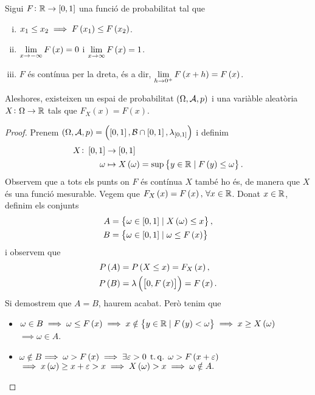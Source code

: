 \begin{teo}
  Sigui $F\colon \mathbb{R} \to [0,1]$ una funció de probabilitat tal que
  \begin{enumerate}[i)]
       \item $x_1\leq x_2\implies F\left( x_1\right) \leq F\left( x_2\right)$.
       \item $\lim\limits_{x\to-\infty}F\left( x\right) = 0$ i $\lim\limits_{x\to\infty}F\left( x\right) = 1$.
       \item $F$ és contínua per la dreta, és a dir, $\lim\limits_{h\to 0^+}F\left( x+h\right) = F\left( x\right)$.
   \end{enumerate}
   Aleshores, existeixen un espai de probabilitat $\left( \Omega,\mathcal{A},p\right)$ i una variàble aleatòria $X\colon\Omega\to\mathbb{R}$ tals que $F_X(x)=F(x)$.
\end{teo}
\begin{proof}
    Prenem $\left(\Omega,\mathcal{A},p\right)=\left(\left[ 0,1\right],\mathcal{B}\cap\left[ 0,1\right],\lambda_{\left[ 0,1\right]}\right)$ i definim
    \begin{align*}
        X\colon\left[ 0,1\right] &\to\left[ 0,1\right]\\
        \omega &\mapsto X\left(\omega\right)=\sup\left\{ y\in\mathbb{R}\mid F\left( y\right)\leq\omega\right\}.
    \end{align*}
    Observem que a tots els punts on $F$ és contínua $X$ també ho és, de manera que $X$ és una funció mesurable. Vegem que $F_X\left( x\right)=F\left( x\right),\,\forall x\in\mathbb{R}$. Donat $x\in\mathbb{R}$, definim els conjunts
    \begin{align*}
        A&=\left\{\omega\in\left[ 0,1\right]\mid X\left(\omega\right)\leq x\right\},\\
        B&=\left\{\omega\in\left[ 0,1\right]\mid \omega\leq F\left( x\right)\right\}
    \end{align*}
    i observem que
    \begin{align*}
        P\left( A\right)&=P\left( X\leq x\right) = F_X\left( x\right),\\
        P\left( B\right)&=\lambda\left(\left[ 0,F\left( x\right)\right]\right)=F\left( x\right).\\
    \end{align*}
    Si demostrem que $A=B$, haurem acabat. Però tenim que
    \begin{itemize}
        \item $\omega\in B\implies\omega\leq F\left( x\right)\implies x\notin\left\{ y\in\mathbb{R}\mid F\left( y\right)<\omega\right\}\implies x\geq X\left(\omega\right)$$\implies\omega\in A$.
        \item $\omega\notin B$$\implies\omega>F\left( x\right)\implies\exists\varepsilon>0\operatorname{\;t.q.\;}\omega>F\left( x+\varepsilon\right)$$\implies x\left(\omega\right)\geq x+\varepsilon>x\implies X\left(\omega\right)>x\implies\omega\notin A.$
    \end{itemize}
    
\end{proof}

